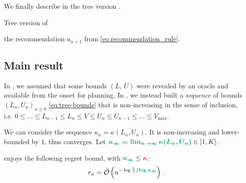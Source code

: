 \documentclass[runningheads]{llncs}
\begin{document}


We finally describe in  the tree version \GBOPD.

\begin{algorithm}[H]
	\caption{Tree version of }
	\label{alg:gbop-t}
	\DontPrintSemicolon
	\Return the recommendation $a_{n+1}$ from \eqref{eq:recommendation_rule}.\;
\end{algorithm}

\subsection{Main result}

In , we assumed that some bounds $(L,\,U)$ were revealed by an oracle and available from the onset for planning. In , we instead built a \emph{sequence} of bounds $(L_n,U_n)_{n\geq 0}$ \eqref{eq:tree-bounds} that is non-increasing in the sense of inclusion, i.e. $0\leq \dots\leq L_{n-1}\leq L_n\leq V\leq U_n\leq U_{n-1}\leq \dots\leq V_{\max}$.

We can consider the sequence $\kappa_n = \kappa(L_n, U_n)$. It is non-increasing and lower-bounded by $1$, thus converges. Let $\hlgb{\kappa_\infty = \lim_{n\rightarrow\infty} \kappa(L_n, U_n)} \in[1,K]$.

\begin{theorem}
\label{thm:regret-gbop-t}
 enjoys the following regret bound, with $\hlgb{\kappa_\infty} \leq \hlrb{\kappa}$: 
\begin{align*}
r_n = \tilde{\cO}\left(n^{-\log \frac{1}{\gamma}/\hlgb{\log \kappa_\infty}}\right).
\end{align*}
\end{theorem}
\end{document}
